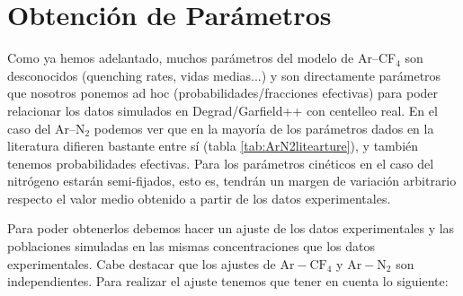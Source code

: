 \documentclass[12pt,a4paper]{article}
\newcommand{\N}{\mathrm{N}}
\newcommand{\Ar}{\mathrm{Ar}}
\newcommand{\CF}{\mathrm{CF}}
\begin{document}
\section{Obtención de Parámetros}


Como ya hemos adelantado, muchos parámetros del modelo de Ar--CF$_4$ son desconocidos (quenching rates, vidas medias...) y son directamente parámetros que nosotros ponemos ad hoc (probabilidades/fracciones efectivas) para poder relacionar los datos simulados en Degrad/Garfield++ con centelleo real. En el caso del Ar--N$_2$ podemos ver que en la mayoría de los parámetros dados en la literatura difieren bastante entre sí (tabla \ref{tab:ArN2litearture}), y también tenemos probabilidades efectivas. Para los parámetros cinéticos en el caso del nitrógeno estarán semi-fijados, esto es, tendrán un margen de variación arbitrario respecto el valor medio obtenido a partir de los datos experimentales. 

Para poder obtenerlos debemos hacer un ajuste de los datos experimentales y las poblaciones simuladas en las mismas concentraciones que los datos experimentales. Cabe destacar que los ajustes de $\Ar-\CF_4$ y $\Ar-\N_2$ son independientes. Para realizar el ajuste tenemos que tener en cuenta lo siguiente:
\end{document}
